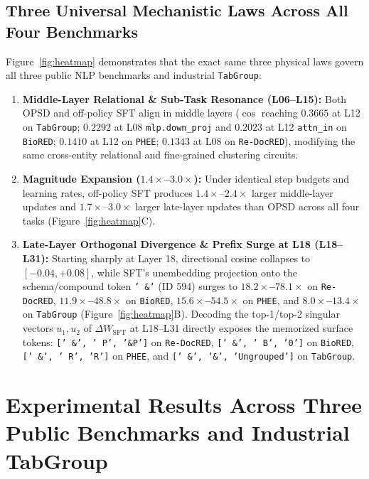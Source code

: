 \documentclass[11pt,a4paper]{article}
\begin{document}
\subsection{Three Universal Mechanistic Laws Across All Four Benchmarks}
Figure~\ref{fig:heatmap} demonstrates that the exact same three physical laws govern all three public NLP benchmarks and industrial \texttt{TabGroup}:
\begin{enumerate}
    \item \textbf{Middle-Layer Relational \& Sub-Task Resonance (L06--L15):} Both OPSD and off-policy SFT align in middle layers ($\cos$ reaching $0.3665$ at L12 on \texttt{TabGroup}; $0.2292$ at L08 \texttt{mlp.down\_proj} and $0.2023$ at L12 \texttt{attn\_in} on \texttt{BioRED}; $0.1410$ at L12 on \texttt{PHEE}; $0.1343$ at L08 on \texttt{Re-DocRED}), modifying the same cross-entity relational and fine-grained clustering circuits.
    \item \textbf{Magnitude Expansion ($1.4\times$--$3.0\times$):} Under identical step budgets and learning rates, off-policy SFT produces $1.4\times$--$2.4\times$ larger middle-layer updates and $1.7\times$--$3.0\times$ larger late-layer updates than OPSD across all four tasks (Figure~\ref{fig:heatmap}C).
    \item \textbf{Late-Layer Orthogonal Divergence \& Prefix Surge at L18 (L18--L31):} Starting sharply at Layer 18, directional cosine collapses to $[-0.04, +0.08]$, while SFT's unembedding projection onto the schema/compound token \texttt{' \&'} (ID 594) surges to \textbf{$18.2\times$--$78.1\times$} on \texttt{Re-DocRED}, \textbf{$11.9\times$--$48.8\times$} on \texttt{BioRED}, \textbf{$15.6\times$--$54.5\times$} on \texttt{PHEE}, and \textbf{$8.0\times$--$13.4\times$} on \texttt{TabGroup} (Figure~\ref{fig:heatmap}B). Decoding the top-1/top-2 singular vectors $u_1, u_2$ of $\Delta W_{\text{SFT}}$ at L18--L31 directly exposes the memorized surface tokens: \texttt{[' \&', ' P', '\&P']} on \texttt{Re-DocRED}, \texttt{[' \&', ' B', '0']} on \texttt{BioRED}, \texttt{[' \&', ' R', 'R']} on \texttt{PHEE}, and \texttt{[' \&', '\&', 'Ungrouped']} on \texttt{TabGroup}.
\end{enumerate}

\section{Experimental Results Across Three Public Benchmarks and Industrial TabGroup}
\end{document}
